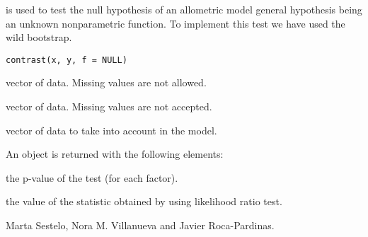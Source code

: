 %
\begin{Description}\relax
{} is used to test the null hypothesis of an allometric model 
 general hypothesis  being  an unknown nonparametric function. To implement this test we have used the wild bootstrap.



\end{Description}
%
\begin{Usage}
\begin{verbatim}
contrast(x, y, f = NULL)
\end{verbatim}
\end{Usage}
%
\begin{Arguments}
\begin{ldescription}
\item[\code{x}] vector of  data. Missing values are not allowed.

\item[\code{y}] vector of  data. Missing values are not accepted.

\item[\code{f}] vector of  data  to take into account in the model.

\end{ldescription}
\end{Arguments}
%
\begin{Value}
An object is returned with the following elements:
\begin{ldescription}
\item[\code{value}] the p-value of the test (for each factor).
\item[\code{statistic}] the value of the statistic obtained by using likelihood ratio test.
\end{ldescription}
\end{Value}
%
\begin{Author}\relax
Marta Sestelo, Nora M. Villanueva and Javier Roca-Pardinas.
\end{Author}
%
\begin{Examples}
\end{Examples}
